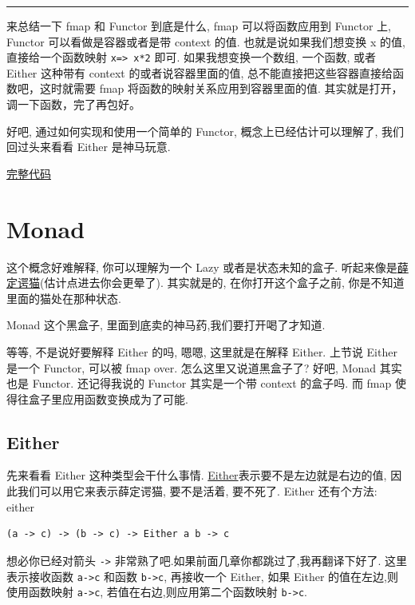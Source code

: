 \documentclass[a5paper]{book}
\begin{document}
\rule{\linewidth}{0.5pt}

来总结一下 fmap 和 Functor 到底是什么, fmap 可以将函数应用到 Functor 上,
Functor 可以看做是容器或者是带 context 的值. 也就是说如果我们想变换 x
的值, 直接给一个函数映射 \texttt{x=> x*2} 即可. 如果我想变换一个数组, 一个函数,
或者 Either 这种带有 context 的或者说容器里面的值,
总不能直接把这些容器直接给函数吧，这时就需要 fmap
将函数的映射关系应用到容器里面的值.
其实就是打开，调一下函数，完了再包好。

好吧, 通过如何实现和使用一个简单的 Functor, 概念上已经估计可以理解了,
我们回过头来看看 Either 是神马玩意.

\href{http://jsbin.com/xezun/1/embed?js,console}{完整代码}
\part{Monad}
\label{sec:orgheadline42}

这个概念好难解释, 你可以理解为一个 Lazy 或者是状态未知的盒子.
听起来像是\href{http://zh.wikipedia.org/wiki/\%E8\%96\%9B\%E5\%AE\%9A\%E8\%B0\%94\%E7\%8C\%AB}{薛定谔猫}(估计点进去你会更晕了).
其实就是的, 在你打开这个盒子之前, 你是不知道里面的猫处在那种状态.

Monad 这个黑盒子, 里面到底卖的神马药,我们要打开喝了才知道.

等等, 不是说好要解释 Either 的吗, 嗯嗯, 这里就是在解释 Either. 上节说
Either 是一个 Functor, 可以被 fmap over. 怎么这里又说道黑盒子了? 好吧,
Monad 其实也是 Functor. 还记得我说的 Functor 其实是一个带 context
的盒子吗. 而 fmap 使得往盒子里应用函数变换成为了可能.

\chapter{Either}
\label{sec:orgheadline36}

先来看看 Either 这种类型会干什么事情.
\href{http://hackage.haskell.org/package/base-4.7.0.0/docs/Data-Either.html#t:Either}{Either}表示要不是左边就是右边的值,
因此我们可以用它来表示薛定谔猫, 要不是活着, 要不死了. Either 还有个方法:
either

\begin{verbatim}
(a -> c) -> (b -> c) -> Either a b -> c
\end{verbatim}

想必你已经对箭头 \texttt{->} 非常熟了吧.如果前面几章你都跳过了,我再翻译下好了.
这里表示接收函数 \texttt{a->c} 和函数 \texttt{b->c}, 再接收一个 Either, 如果 Either
的值在左边,则使用函数映射 \texttt{a->c}, 若值在右边,则应用第二个函数映射 \texttt{b->c}.
\end{document}
